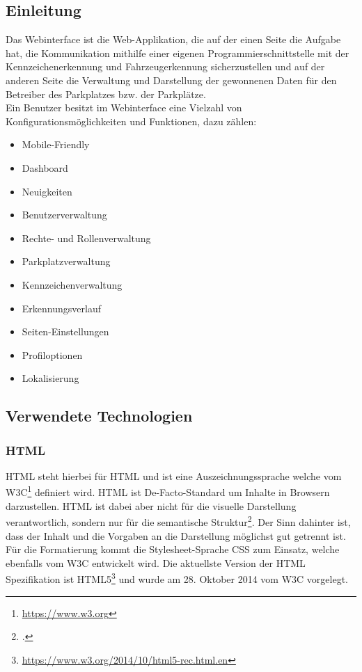 \def \sectionauthors {Philipp Kraft}

\subsection{Einleitung}
Das Webinterface ist die Web-Applikation, die auf der einen Seite die Aufgabe hat,
die Kommunikation mithilfe einer eigenen Programmierschnittstelle mit der
Kennzeichenerkennung und Fahrzeugerkennung sicherzustellen und auf der anderen
Seite die Verwaltung und Darstellung der gewonnenen Daten für den Betreiber des
Parkplatzes bzw. der Parkplätze.\\

Ein Benutzer besitzt im Webinterface eine Vielzahl von
Konfigurationsmöglichkeiten und Funktionen, dazu zählen:

\begin{itemize}
  \item Mobile-Friendly
  \item Dashboard
  \item Neuigkeiten
  \item Benutzerverwaltung
  \item Rechte- und Rollenverwaltung
  \item Parkplatzverwaltung
  \item Kennzeichenverwaltung
  \item Erkennungsverlauf
  \item Seiten-Einstellungen
  \item Profiloptionen
  \item Lokalisierung
\end{itemize}

\subsection{Verwendete Technologien}
\subsubsection{HTML}
\acs*{HTML} steht hierbei für \acl*{HTML} und ist eine Auszeichnungssprache
welche vom \ac*{W3C}\footnote{\url{https://www.w3.org} } definiert wird.
\ac*{HTML} ist De-Facto-Standard um Inhalte in Browsern darzustellen.
\acs*{HTML} ist dabei aber nicht für die visuelle Darstellung verantwortlich,
sondern nur für die semantische Struktur\footcite[]{htmlwhatwg}. Der Sinn dahinter ist, dass der Inhalt
und die Vorgaben an die Darstellung möglichst gut getrennt ist. Für die
Formatierung kommt die Stylesheet-Sprache \ac*{CSS} zum Einsatz, welche
ebenfalls vom \acl*{W3C} entwickelt wird. Die aktuellste Version der \acs*{HTML}
Spezifikation ist
HTML5\footnote{\url{https://www.w3.org/2014/10/html5-rec.html.en}} und wurde am
28. Oktober 2014 vom \acs*{W3C} vorgelegt.

